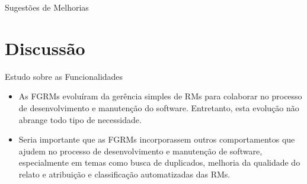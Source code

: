 \documentclass[t,14pt,mathserif]{beamer}
\begin{document}
\begin{frame}{Sugestões de Melhorias}

\begin{table}[htpb]
\centering
{}
\caption{Ordenamento das sugestões pelo grau de dificuldade.}
\label{tab:ranking_implementacao_sug_melhorias}
\end{table}

\end{frame}

\section{Discussão}

\begin{frame}{Estudo sobre as Funcionalidades}
    \begin{itemize}
        \item As FGRMs evoluíram da gerência simples de RMs para colaborar no
            processo de desenvolvimento e manutenção do software. Entretanto,
            esta evolução não abrange todo tipo de necessidade.
        \item Seria importante que as FGRMs incorporassem outros comportamentos
            que ajudem no processo de desenvolvimento e manutenção de software,
            especialmente em temas como busca de duplicados, melhoria da
            qualidade do relato e atribuição e classificação automatizadas das
            RMs.
    \end{itemize}
\end{frame}
\end{document}
